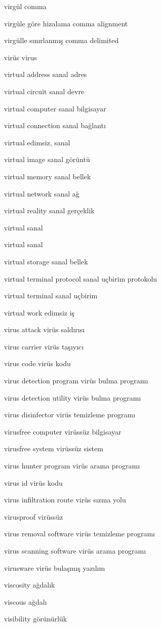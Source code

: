 \documentclass[12pt,fleqn]{article}\usepackage{../../common}
\begin{document}
virgül comma

virgüle göre hizalama comma alignment

virgülle sınırlanmış comma delimited

virüs virus

virtual address sanal adres

virtual circuit sanal devre

virtual computer sanal bilgisayar

virtual connection sanal bağlantı

virtual edimsiz, sanal

virtual image sanal görüntü

virtual memory sanal bellek

virtual network sanal ağ

virtual reality sanal gerçeklik

virtual sanal

virtual sanal

virtual storage sanal bellek

virtual terminal protocol sanal uçbirim protokolu

virtual terminal sanal uçbirim

virtual work edimsiz iş

virus attack virüs saldırısı

virus carrier virüs taşıyıcı

virus code virüs kodu

virus detection program virüs bulma programı

virus detection utility virüs bulma programı

virus disinfector virüs temizleme programı

virusfree computer virüssüz bilgisayar

virusfree system virüssüz sistem

virus hunter program virüs arama programı

virus id virüs kodu

virus infiltration route virüs sızma yolu

virusproof virüssüz

virus removal software virüs temizleme programı

virus scanning software virüs arama programı

virusware virüs bulaşmış yazılım

viscosity ağdalık

viscous ağdalı

visibility görünürlük
\end{document}
